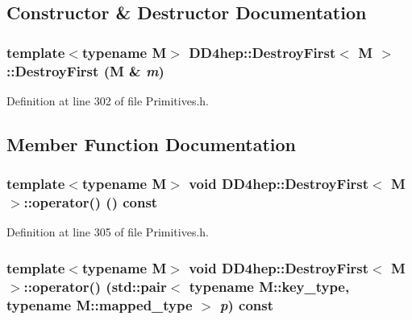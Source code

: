 \subsection{Constructor \& Destructor Documentation}
\hypertarget{class_d_d4hep_1_1_destroy_first_a2ab7069ab1062311f4ad6e7c5e93d340}{
\subsubsection[{DestroyFirst}]{\setlength{\rightskip}{0pt plus 5cm}template$<$typename M$>$ {\bf DD4hep::DestroyFirst}$<$ M $>$::{\bf DestroyFirst} (M \& {\em m})}}
\label{class_d_d4hep_1_1_destroy_first_a2ab7069ab1062311f4ad6e7c5e93d340}


Definition at line 302 of file Primitives.h.

\subsection{Member Function Documentation}
\hypertarget{class_d_d4hep_1_1_destroy_first_a81183efd460f5215e850f72a444f3716}{
\subsubsection[{operator()}]{\setlength{\rightskip}{0pt plus 5cm}template$<$typename M$>$ void {\bf DD4hep::DestroyFirst}$<$ M $>$::operator() () const}}
\label{class_d_d4hep_1_1_destroy_first_a81183efd460f5215e850f72a444f3716}


Definition at line 305 of file Primitives.h.\hypertarget{class_d_d4hep_1_1_destroy_first_a05bc6ba28234f2ec296ac9a8185cca4b}{
\subsubsection[{operator()}]{\setlength{\rightskip}{0pt plus 5cm}template$<$typename M$>$ void {\bf DD4hep::DestroyFirst}$<$ M $>$::operator() (std::pair$<$ typename M::key\_\-type, typename M::mapped\_\-type $>$ {\em p}) const}}
\label{class_d_d4hep_1_1_destroy_first_a05bc6ba28234f2ec296ac9a8185cca4b}


